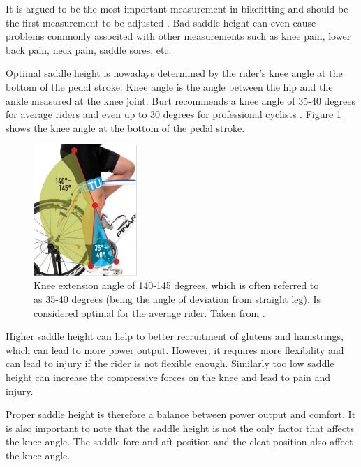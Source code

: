 It is argued to be the most important measurement in bikefitting and should be the first measurement to be adjusted \cite{burtbikefit}. Bad saddle height can even cause problems commonly associted with other measurements such as knee pain, lower back pain, neck pain, saddle sores, etc.

Optimal saddle height is nowadays determined by the rider's knee angle at the bottom of the pedal stroke. Knee angle is the angle between the hip and the ankle measured at the knee joint. Burt recommends a knee angle of 35-40 degrees for average riders and even up to 30 degrees for professional cyclists \cite{burtbikefit}. Figure \ref{fig:saddle_height} shows the knee angle at the bottom of the pedal stroke.

\begin{figure}[htb]
    \centering
    \includegraphics[width=0.35\textwidth]{obrazky-figures/burt_knee_angle.png}
    \caption{Knee extension angle of 140-145 degrees, which is often referred to as 35-40 degrees (being the angle of deviation from straight leg). Is considered optimal for the average rider. Taken from \cite{burtbikefit}.}
    \label{fig:saddle_height}
\end{figure}



Higher saddle height can help to better recruitment of glutens and hamstrings, which can lead to more power output. However, it requires more flexibility and can lead to injury if the rider is not flexible enough. Similarly too low saddle height can increase the compressive forces on the knee and lead to pain and injury.

Proper saddle height is therefore a balance between power output and comfort. It is also important to note that the saddle height is not the only factor that affects the knee angle. The saddle fore and aft position and the cleat position also affect the knee angle.




